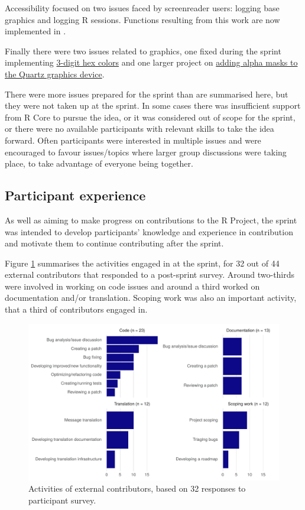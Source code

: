 Accessibility focused on two issues faced by screenreader users: logging base
graphics and logging R sessions. Functions resulting from this work are now
implemented in .

Finally there were two issues related to graphics, one fixed during the sprint
implementing \href{https://github.com/r-devel/r-project-sprint-2023/issues/74}{3-digit hex colors} and one
larger project on \href{https://github.com/r-devel/r-project-sprint-2023/issues/43}{adding alpha masks to the Quartz graphics device}.

There were more issues prepared for the sprint than are summarised here, but
they were not taken up at the sprint. In some cases there was insufficient support from R Core to pursue the idea, or it was considered out of scope for the sprint, or there were no available participants with relevant skills to take the idea forward. Often participants were interested in multiple issues and were encouraged to favour issues/topics where larger group discussions were taking
place, to take advantage of everyone being together.

\hypertarget{participant-experience}{%
\subsection{Participant experience}\label{participant-experience}}

As well as aiming to make progress on contributions to the R Project, the
sprint was intended to develop participants' knowledge and experience in
contribution and motivate them to continue contributing after the sprint.

Figure \ref{fig:activities} summarises the activities engaged in at the sprint, for 32 out of 44 external contributors that responded to a post-sprint survey.
Around two-thirds were involved in working on code issues and around a third worked on documentation and/or translation. Scoping work was also an important activity, that a third of contributors engaged in.

\begin{figure}
\includegraphics[width=1\linewidth]{figures/sprint_activities} \caption{Activities of external contributors, based on 32 responses to participant survey.}\label{fig:activities}
\end{figure}

